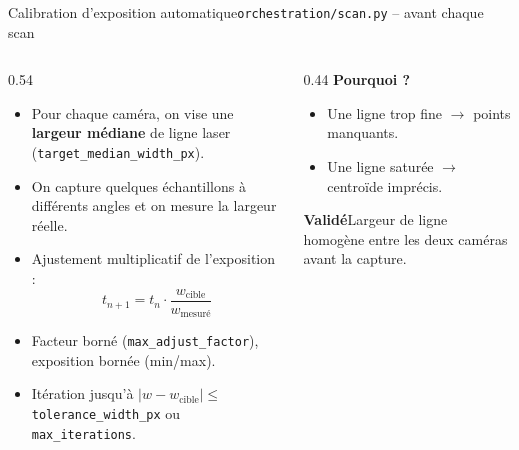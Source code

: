 \documentclass[aspectratio=169,10pt]{beamer}
\newcommand{\validbox}[1]{%
  \begin{beamercolorbox}[wd=\linewidth,sep=0.25cm,rounded=true]{}
    \colorbox{softgreen}{%
      \parbox{\dimexpr\linewidth-0.5cm\relax}{\textbf{\textcolor{deepblue}{Valid\'{e}}}\quad #1}%
    }
  \end{beamercolorbox}
}
\begin{document}
\begin{frame}{Calibration d'exposition automatique}{\texttt{orchestration/scan.py} -- avant chaque scan}
  \begin{columns}[T,onlytextwidth]
    \begin{column}{0.54\textwidth}
      \footnotesize
      \begin{itemize}
        \item Pour chaque cam\'{e}ra, on vise une \textbf{largeur m\'{e}diane} de ligne laser (\texttt{target\_median\_width\_px}).
        \item On capture quelques \'{e}chantillons \`{a} diff\'{e}rents angles et on mesure la largeur r\'{e}elle.
        \item Ajustement multiplicatif de l'exposition :
          \[ t_{n+1} = t_n \cdot \frac{w_{\text{cible}}}{w_{\text{mesur\'{e}}}} \]
        \item Facteur born\'{e} (\texttt{max\_adjust\_factor}), exposition born\'{e}e (min/max).
        \item It\'{e}ration jusqu'\`{a} $|w - w_{\text{cible}}| \leq$ \texttt{tolerance\_width\_px} ou \texttt{max\_iterations}.
      \end{itemize}
    \end{column}
    \begin{column}{0.44\textwidth}
      \small
      \textbf{Pourquoi ?}
      \begin{itemize}
        \item Une ligne trop fine $\rightarrow$ points manquants.
        \item Une ligne satur\'{e}e $\rightarrow$ centro\"{i}de impr\'{e}cis.
      \end{itemize}
      \vspace{0.15cm}
      \validbox{Largeur de ligne homog\`{e}ne entre les deux cam\'{e}ras avant la capture.}
    \end{column}
  \end{columns}
\end{frame}
\end{document}
